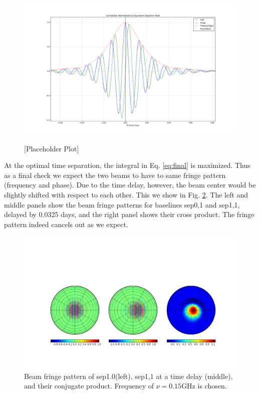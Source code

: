 \documentclass[preprint2,numberedappendix,tighten,twocolappendix]{aastex6}  %
\renewcommand\[{\begin{equation}}
\renewcommand\]{\end{equation}}
\begin{document}
\begin{figure}[H]
\includegraphics[width=\linewidth]{redun_agree}
\label{fig:numerics}
\caption{[Placeholder Plot]}
\end{figure}


At the optimal time separation, the integral in Eq. \eqref{eq:final}
is maximized. Thus as a final check we expect the two beams to have to same fringe pattern
(frequency and phase). Due to the time delay, however, the beam center
would be slightly shifted with respect to each other. This we show
in Fig. \ref{fig:Beam-fringe-pattern}. The left and middle panels show the beam fringe
patterns for baselines sep0,1 and sep1,1, delayed by 0.0325 days,
and the right panel shows their cross product. The fringe pattern
indeed cancels out as we expect. 

\begin{widetext}
\begin{figure}[H]
\includegraphics[scale=0.5]{fringe_res}

\caption{Beam fringe pattern of sep1.0(left), sep1,1 at a time delay (middle),
and their conjugate product. Frequency of $\nu=0.15\text{GHz}$ is
chosen. \label{fig:Beam-fringe-pattern}}
\end{figure}
\end{widetext}
\end{document}
